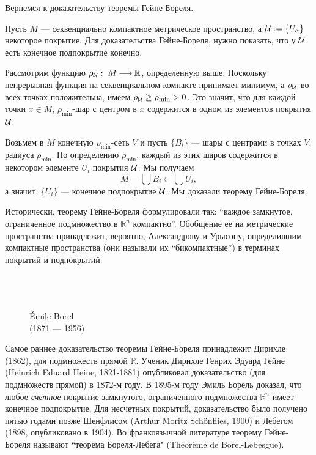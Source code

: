\documentclass[12pt]{book}
\newcommand{\arrow}{{\:\longrightarrow\:}}
\def\endproof{\hbox{\vrule width 5pt height 5pt depth 0pt}}
\def\R{{\mathbb R}}
\theoremstyle{upshape}
\theoremstyle{generic}
\def\еза{\end{remark}}
\theoremstyle{upshapenonumber}
\newcommand{\следствие}{%
     \refstepcounter{teorema}
     {\noindent\bf Следствие \thechapter.\arabic{teorema}:\ }}
\newcommand{\пример}{%
     \refstepcounter{teorema}
     {\noindent\bf Пример \thechapter.\arabic{teorema}:\ }}
\newcommand{\лемма}{%
     \refstepcounter{teorema}
     {\noindent\bf Лемма \thechapter.\arabic{teorema}:\ }}
\newcommand{\теорема}{%
     \refstepcounter{teorema}
     {\noindent\bf Теорема \thechapter.\arabic{teorema}:\ }}
\newcommand{\утверждение}{%
     \refstepcounter{teorema}
     {\noindent\bf Утверждение \thechapter.\arabic{teorema}:\ }}
\def\ем{\em}
\def\ез{\end{zadacha}}
\def\еу{\end{ukazanie}}
\def\ео{\end{opredelenie}}
\def\енум{\begin{enumerate}}
\def\ее{\end{enumerate}}
\begin{document}
Вернемся к доказательству теоремы Гейне-Бореля.

Пусть $M$ --- секвенциально компактное 
метрическое пространство, а ${\cal U}:= \{ U_\alpha\}$
некоторое покрытие. Для доказательства
Гейне-Бореля, нужно показать, что у ${\cal U}$ 
есть конечное подпокрытие конечно.

Рассмотрим функцию 
$\rho_{\cal U}:\; M \arrow \R$, определенную выше.
Поскольку непрерывная функция на секвенциальном
компакте принимает минимум, а $\rho_{\cal U}$
во всех точках положительна, имеем 
$\rho_{\cal U}\geq{\rho_{\min}} >0$.
Это значит, что для каждой точки $x\in M$,
${\rho_{\min}}$-шар с центром в $x$ содержится
в одном из элементов покрытия ${\cal U}$.

Возьмем в $M$ конечную $\rho_{\min}$-сеть $V$
и пусть $\{B_i\}$ --- шары с центрами в точках $V$,
радиуса $\rho_{\min}$. По определению $\rho_{\min}$,
каждый из этих шаров содержится
в некотором элементе $U_i$ покрытия ${\cal U}$.
Мы получаем
\[
M = \bigcup B_i \subset \bigcup U_i,
\]
а значит, $\{U_i\}$ --- конечное подпокрытие ${\cal U}$.
Мы доказали теорему Гейне-Бореля. \endproof

\hfill

Исторически, теорему Гейне-Бореля формулировали
так: ``каждое замкнутое, ограниченное подмножество в $\R^n$
компактно''. Обобщение ее на метрические пространства 
принадлежит, вероятно, Александрову и Урысону,
определившим компактные пространства (они называли
их ``бикомпактные'') в терминах покрытий и подпокрытий.


\begin{figure}[ht]
\begin{center}
\ \\ \ \\
\\
\'Emile Borel\\
(1871 --- 1956)
\end{center}
\end{figure}

Самое раннее доказательство теоремы Гейне-Бореля 
принадлежит Дирихле (1862), для подмножеств прямой $\R$.
Ученик Дирихле  Генрих Эдуард Гейне (Heinrich Eduard Heine, 1821-1881)
опубликовал доказательство (для подмножеств 
прямой) в 1872-м году. В 1895-м году
 Эмиль Борель  доказал, что любое {\ем счетное} покрытие
замкнутого, ограниченного подмножества $\R^n$
имеет конечное подпокрытие. Для несчетных покрытий,
доказательство было получено пятью годами позже
Шенфлисом (Arthur Moritz Sch\"onflies, 1900) и 
Лебегом (1898, опубликовано в 1904). Во 
франкоязычной литературе теорему Гейне-Бореля
называют ``теорема Бореля-Лебега" (Th\'eor\`eme de
Borel-Lebesgue).
\end{document}
